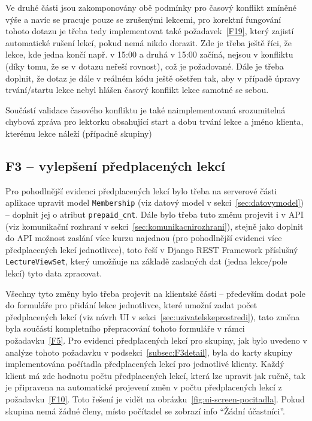 Ve druhé části jsou zakomponovány obě podmínky pro časový konflikt zmíněné výše a navíc se pracuje pouze se zrušenými lekcemi, pro korektní fungování tohoto dotazu je třeba tedy implementovat také požadavek~\ref{F19}, který zajistí automatické rušení lekcí, pokud nemá nikdo dorazit. Zde je třeba ještě říci, že lekce, kde jedna končí např. v 15:00 a druhá v 15:00 začíná, nejsou v konfliktu (díky tomu, že se v dotazu neřeší rovnost), což je požadované. Dále je třeba doplnit, že dotaz je dále v reálném kódu ještě ošetřen tak, aby v případě úpravy trvání/startu lekce nebyl hlášen časový konflikt lekce samotné se sebou.

Součástí validace časového konfliktu je také naimplementovaná srozumitelná chybová zpráva pro lektorku obsahující start a dobu trvání lekce a jméno klienta, kterému lekce náleží (případně skupiny)

\subsection{F3 -- vylepšení předplacených lekcí}

Pro pohodlnější evidenci předplacených lekcí bylo třeba na serverové části aplikace upravit model \verb|Membership| (viz datový model v sekci~\ref{sec:datovymodel}) -- doplnit jej o atribut \verb|prepaid_cnt|. Dále bylo třeba tuto změnu projevit i v API (viz komunikační rozhraní v sekci~\ref{sec:komunikacnirozhrani}), stejně jako doplnit do API možnost zaslání více kurzu najednou (pro pohodlnější evidenci více předplacených lekcí jednotlivce), toto řeší v Django REST Framework příslušný \verb|LectureViewSet|, který umožňuje na základě zaslaných dat (jedna lekce/pole lekcí) tyto data zpracovat.

Všechny tyto změny bylo třeba projevit na klientské části -- především dodat pole do formuláře pro přidání lekce jednotlivce, které umožní zadat počet předplacených lekcí (viz návrh UI v sekci~\ref{sec:uzivatelskeprostredi}), tato změna byla součástí kompletního přepracování tohoto formuláře v rámci požadavku~\ref{F5}. Pro evidenci předplacených lekcí pro skupiny, jak bylo uvedeno v analýze tohoto požadavku v podsekci~\ref{subsec:F3detail}, byla do karty skupiny implementována počítadla předplacených lekcí pro jednotlivé klienty. Každý klient má zde hodnotu počtu předplacených lekcí, která lze upravit jak ručně, tak je připravena na automatické projevení změn v počtu předplacených lekcí z požadavku~\ref{F10}. Toto řešení je vidět na obrázku~\ref{fig:ui-screen-pocitadla}. Pokud skupina nemá žádné členy, místo počítadel se zobrazí info \enquote{Žádní účastníci}.

